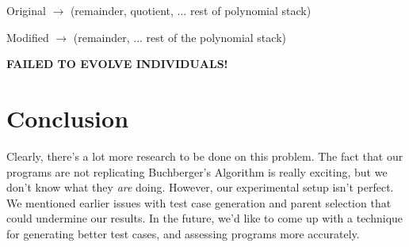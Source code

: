 \documentclass[20pt]{extarticle}
\begin{document}
\noindent Original $\rightarrow$ (remainder, quotient, ... rest of polynomial stack)

\noindent Modified $\rightarrow$ (remainder, ... rest of the polynomial stack)

\noindent \textbf{FAILED TO EVOLVE INDIVIDUALS!}


\newpage
\section*{Conclusion}

Clearly, there's a lot more research to be done on this problem.
The fact that our programs are not replicating Buchberger's Algorithm is really exciting, but we don't know what they {\it are} doing.
However, our experimental setup isn't perfect.
We mentioned earlier issues with test case generation and parent selection that could undermine our results.
In the future, we'd like to come up with a technique for generating better test cases, and assessing programs more accurately.
\end{document}
